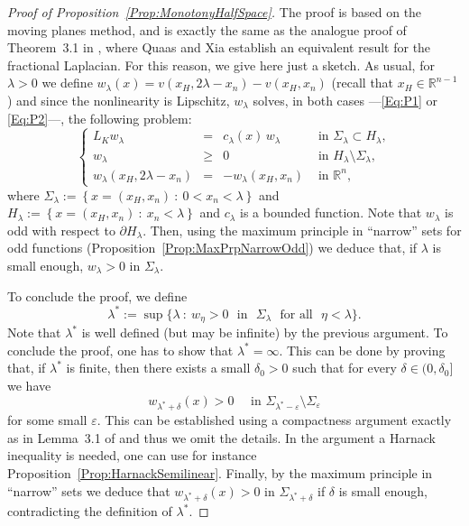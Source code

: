 \documentclass[12pt,reqno]{amsart}
\theoremstyle{definition}
\theoremstyle{remark}
\newcommand{\con}[1]{\mathbb{#1}}
\newcommand{\R}{\con{R}} %
\newcommand\beqc[1]{\left\{\begin{array}{#1}}
\newcommand\eeqc{\end{array} \right.}
\def\PDEsystem{rcll}
\numberwithin{equation}{section}
\begin{document}
\begin{proof}[Proof of Proposition~\ref{Prop:MonotonyHalfSpace}]
	The proof is based on the moving planes method, and is exactly the same as the analogue proof of Theorem~3.1 in \cite{QuaasXia}, where Quaas and Xia establish an equivalent result for the fractional Laplacian. For this reason, we give here just a sketch. As usual, for $\lambda > 0$ we define $w_\lambda (x) = v(x_H,2\lambda - x_n)-v(x_H,x_n)$ (recall that $x_H\in \R^{n-1}$) and since the nonlinearity is Lipschitz, $w_\lambda$ solves, in both cases ---\eqref{Eq:P1} or \eqref{Eq:P2}---, the following problem:
	$$
	\beqc{\PDEsystem} 
	L_K  w_\lambda &=& c_\lambda(x)\,w_\lambda  &\textrm{ in } \Sigma_\lambda\subset H_\lambda,\\ 
	w_\lambda &\geq& 0 &\textrm{ in } H_\lambda\setminus\Sigma_\lambda,\\ 
	w_\lambda(x_H,2\lambda - x_n) &=& - w_\lambda(x_H,x_n)  &\textrm{ in } \R^n, 
	\eeqc 
	$$
	where $\Sigma_\lambda := \left\{ x = (x_H,x_n) \ : \ 0<x_n<\lambda \right\}$ and $H_\lambda := \left\{ x = (x_H,x_n) \ : \ x_n<\lambda \right\}$ and $c_\lambda$ is a bounded function. Note that $w_\lambda$ is odd with respect to $\partial H_\lambda$. Then, using the maximum principle in ``narrow'' sets for odd functions (Proposition~\ref{Prop:MaxPrpNarrowOdd}) we deduce that, if $\lambda$ is small enough, $w_\lambda>0$ in $\Sigma_\lambda$. 
	
	To conclude the proof, we define
	$$
	\lambda^* := \sup\{\lambda \ : \ w_\eta>0 \,\, \text{ in } \,\, \Sigma_\lambda \,\, \text{ for all } \,\, \eta<\lambda\}.
	$$
	Note that $\lambda^*$ is well defined (but may be infinite) by the previous argument. To conclude the proof, one has to show that $\lambda^*=\infty$. This can be done by proving that, if $\lambda^*$ is finite, then there exists a small $\delta_0 > 0$ such that for every $\delta \in (0,\delta_0]$ we have
	$$
	w_{\lambda^* +  \delta} (x) > 0 \quad \text{ in } \Sigma_{\lambda^*-\varepsilon}\setminus \Sigma_{\varepsilon}
	$$
	for some small $\varepsilon$. This can be established using a compactness argument exactly as in Lemma~3.1 of \cite{QuaasXia} and thus we omit the details. In the argument a Harnack inequality is needed, one can use for instance Proposition~\ref{Prop:HarnackSemilinear}. Finally, by the maximum principle in ``narrow'' sets we deduce that $w_{\lambda^* +  \delta} (x) > 0 $ in $\Sigma_{\lambda^*+\delta}$ if $\delta$ is small enough, contradicting the definition of $\lambda^*$.
\end{proof}
\end{document}
